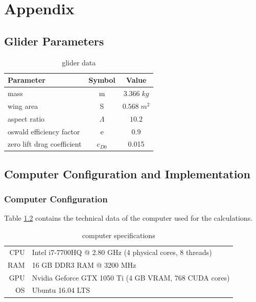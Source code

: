 
\chapter{Appendix}
\section{Glider Parameters}
\label{appendix_A}

\begin{table}[h]
	\begin{center}
		\begin{tabular}{l|c|c}
			Parameter & Symbol & Value \\ \hline
			mass &m& $3.366\;kg$\\
			wing area &S & $0.568\;m^2$ \\
			aspect ratio& $\Lambda$ & $10.2$ \\
			oswald efficiency factor &e& $0.9$ \\
			zero lift drag coefficient&$c_{D0}$ & 0.015 \\
		\end{tabular}
		\caption{glider data}
		\label{tab:glider_data}
	\end{center}
\end{table}

\newpage
\section{Computer Configuration and Implementation}
\label{appendix_B}
\subsection{Computer Configuration}
Table \ref{tab:pc_specs} contains the technical data of the computer used for the calculations.

\begin{table}[h]
	\begin{center}
		\begin{tabular}{r|l}
			CPU & Intel i7-7700HQ @ 2.80 GHz (4 physical cores, 8 threads) \\
			RAM\nomenclature[A]{RAM}{random access memory} & 16 GB DDR3 RAM @ 3200 MHz \\
			GPU & Nvidia Geforce GTX 1050 Ti (4 GB VRAM, 768 CUDA cores) \\
			OS & Ubuntu 16.04 LTS
		\end{tabular}
	\caption{computer specifications}
	\label{tab:pc_specs}
	\end{center}
\end{table}

